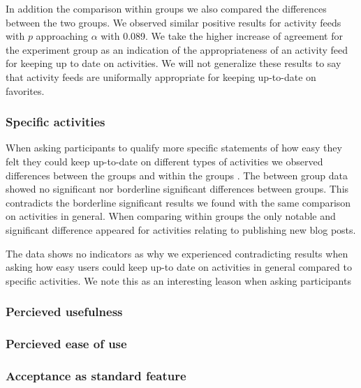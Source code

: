 In addition the comparison within
groups we also compared the differences between the two groups. We observed
similar positive results for activity feeds with $p$ approaching $\alpha$
with 0.089.
We take the higher increase of agreement for the experiment
group as an indication of the appropriateness of an activity feed for keeping
up to date on activities. We will not generalize these results to say that
activity feeds are uniformally appropriate for keeping up-to-date on
favorites.

\subsubsection{Specific activities}

When asking participants to qualify more specific statements of how
easy they felt they could keep up-to-date on different types of activities
we observed differences between%
the groups and within the groups%
.
The between group data showed no significant nor borderline significant
differences between groups. This contradicts the borderline significant
results we found with the same comparison on activities in general.
When comparing within groups the only notable and significant difference
appeared for activities relating to publishing new blog posts.

The data shows no indicators as why we experienced contradicting results
when asking how easy users could keep up-to date on activities in general
compared to specific activities. We note this as an interesting leason
when asking participants

\subsubsection{Percieved usefulness}

\subsubsection{Percieved ease of use}


\subsubsection{Acceptance as standard feature}




